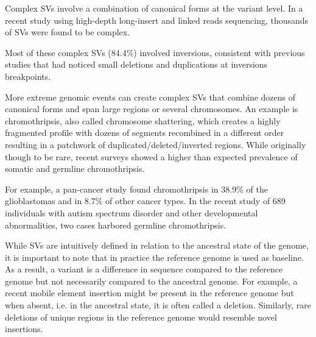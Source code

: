 Complex SVs involve a combination of canonical forms at the variant level\cite{Quinlan2012}.
In a recent study using high-depth long-insert and linked reads sequencing\cite{Collins2017}, thousands of SVs were found to be complex.
\begin{comment}
  In \citet{Collins2017} 2.5\% were complex, 16.8\% were balanced or complex.
\end{comment}
Most of these complex SVs (84.4\%) involved inversions, consistent with previous studies that had noticed small deletions and duplications at inversions breakpoints\cite{Sudmant2015a,Collins2017,Brand2015}.
\begin{comment}
  \citet{Brand2015} describe dupINVdup variants, i.e. paired duplications flanking an inversion. 8.1\% of patients with autism spectrum disorder had one and they found that only 39.3\% of inversions were canonical.
\end{comment}
More extreme genomic events can create complex SVs that combine dozens of canonical forms and span large regions or several chromosomes.
An example is chromothripsis, also called chromosome shattering, which creates a highly fragmented profile with dozens of segments recombined in a different order resulting in a patchwork of duplicated/deleted/inverted regions.
While originally though to be rare, recent surveys showed a higher than expected prevalence of somatic and germline chromothripsis.
\begin{comment}
  Using arrays, \citet{Zack2013} estimated that 5\% of the tumors experienced chromothripsis, while \citet{Kim2013b} came up with a lower number of 1-2\%.
\end{comment}
For example, a pan-cancer study found chromothripsis in 38.9\% of the glioblastomas and in 8.7\% of other cancer types\cite{Malhotra2013}.
In the recent study of 689 individuals with autism spectrum disorder and other developmental abnormalities, two cases harbored germline chromothripsis\cite{Collins2017}.

While SVs are intuitively defined in relation to the ancestral state of the genome, it is important to note that in practice the reference genome is used as baseline.
As a result, a variant is a difference in sequence compared to the reference genome but not necessarily compared to the ancestral genome. 
For example, a recent mobile element insertion might be present in the reference genome but when absent, i.e. in the ancestral state, it is often called a deletion.
Similarly, rare deletions of unique regions in the reference genome would resemble novel insertions.

